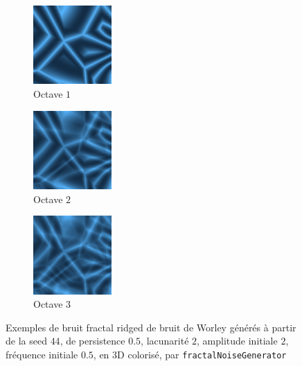 \documentclass[11pt]{article}
\begin{document}
\begin{figure}[H]
    \centering
    \begin{subfigure}{0.2\textwidth}
    \centering
            \includegraphics[width=3cm]{RIDGED-F2F1-DEUCLIDEAN-O1-3DON-P05-L2-IA2-IF05-S44-CLRD.png}
        \caption{Octave $1$}
        \label{fig:ridgedWorleyO1}
    \end{subfigure}
    \begin{subfigure}{0.2\textwidth}
    \centering
        \includegraphics[width=3cm]{RIDGED-F2F1-DEUCLIDEAN-O2-3DON-P05-L2-IA2-IF05-S44-CLRD.png}
        \caption{Octave $2$}
        \label{fig:ridgedWorleyO2}
    \end{subfigure}
    \begin{subfigure}{0.2\textwidth}
    \centering
        \includegraphics[width=3cm]{RIDGED-F2F1-DEUCLIDEAN-O3-3DON-P05-L2-IA2-IF05-S44-CLRD.png}
        \caption{Octave $3$}
        \label{fig:ridgedWorleyO3}
    \end{subfigure}
    \caption{Exemples de bruit fractal ridged de bruit de Worley générés à partir de la seed $44$, de persistence $0.5$, lacunarité $2$, amplitude initiale $2$, fréquence initiale $0.5$, en 3D colorisé, par \texttt{fractalNoiseGenerator}}
    \label{fig:ridgedWorley}
\end{figure}
\end{document}
